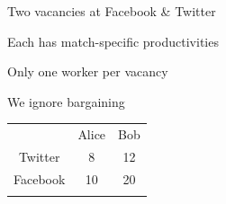 \documentclass[12pt]{beamer}
\begin{document}
\begin{frame}{}
\begin{animateinline}[autoplay]{10}
{\begin{minipage}{\textwidth}
\begin{center}
Two vacancies at Facebook \& Twitter

Each has match-specific productivities

Only one worker per vacancy

We ignore bargaining

\vspace{10 mm}

\begin{tabular}{!{\color{gray\i}\vrule} c !{\color{gray\i}\vrule} c !{\color{gray\i}\vrule} c !{\color{gray\i}\vrule}}
\hline
 & \textcolor{gray\i}{Alice} & \textcolor{gray\i}{Bob} \\
\hline
 \textcolor{gray\i}{Twitter} & \textcolor{gray\i}{8} & \textcolor{gray\i}{12} \\
\hline
 \textcolor{gray\i}{Facebook} & \textcolor{gray\i}{10} & \textcolor{gray\i}{20} \\
\hline
\end{tabular}
\end{center}
\end{minipage}
}
\end{animateinline}
\end{frame}
\end{document}
